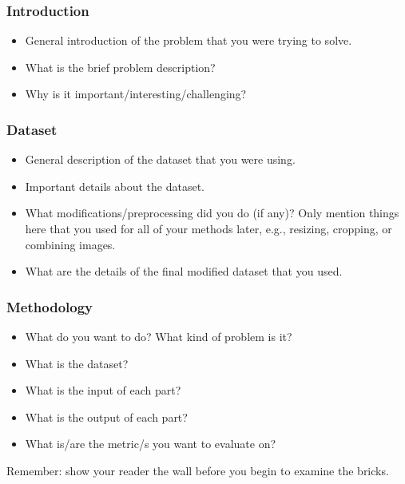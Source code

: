 \subsubsection*{Introduction}
\begin{itemize}
    \item General introduction of the problem that you were trying to solve. 
    \item What is the brief problem description? 
    \item Why is it important/interesting/challenging? 
\end{itemize}


\subsubsection*{Dataset}
\begin{itemize}
    \item General description of the dataset that you were using. 
    \item Important details about the dataset. 
    \item What modifications/preprocessing did you do (if any)? Only mention things here that you used for all of your methods later, e.g., resizing, cropping, or combining images. 
    \item What are the details of the final modified dataset that you used. 
\end{itemize}


\subsubsection*{Methodology}
\begin{itemize}
    \item What do you want to do? What kind of problem is it?
    \item What is the dataset?
    \item What is the input of each part?
    \item What is the output of each part?
    \item What is/are the metric/s you want to evaluate on?
\end{itemize}

Remember: show your reader the wall before you begin to examine the bricks.


